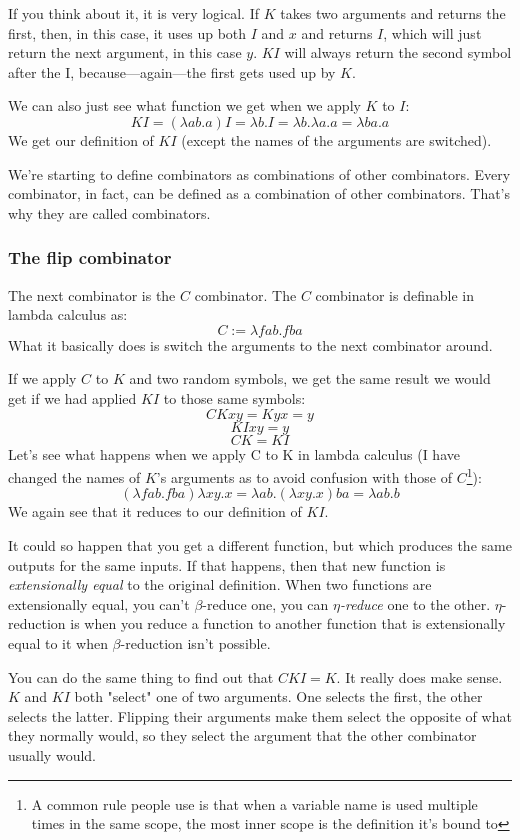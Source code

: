 \documentclass[11pt]{article}
\begin{document}
If you think about it, it is very logical. If \(K\) takes two arguments and
returns the first, then, in this case, it uses up both \(I\) and \(x\) and
returns \(I\), which will just return the next argument, in this case \(y\).
\(KI\) will always return the second symbol after the I, because---again---the
first gets used up by \(K\).

We can also just see what function we get when we apply \(K\) to \(I\):
\[KI=(\lambda ab.a)I=\lambda b.I=\lambda b.\lambda a.a=\lambda ba.a\] We get
our definition of \(KI\) (except the names of the arguments are switched).

We're starting to define combinators as combinations of other combinators.
Every combinator, in fact, can be defined as a combination of other
combinators. That's why they are called combinators.

\subsubsection{The flip combinator}\label{flipcombinator}

The next combinator is the \(C\) combinator. The \(C\) combinator is definable
in lambda calculus as:
\[C:=\lambda fab.fba\]
What it basically does is switch the arguments to the next combinator around.

If we apply \(C\) to \(K\) and two random symbols, we get the same result we
would get if we had applied \(KI\) to those same symbols:
\[CKxy=Kyx=y\]
\[KIxy=y\]
\[CK=KI\]
Let's see what happens when we apply C to K in lambda calculus (I have changed
the names of \(K\)'s arguments as to avoid confusion with those of
\(C\)\footnote{A common rule people use is that when a variable name is used
multiple times in the same scope, the most inner scope is the definition it's
bound to}):
\[(\lambda fab.fba)\lambda xy.x=\lambda ab.(\lambda xy.x)ba=\lambda ab.b\]
We again see that it reduces to our definition of \(KI\).

It could so happen that you get a different function, but which produces the
same outputs for the same inputs. If that happens, then that new function is
\emph{extensionally equal} to the original definition. When two functions are
extensionally equal, you can't \(\beta\)-reduce one, you can
\emph{\(\eta\)-reduce} one to the other. \(\eta\)-reduction is when you reduce
a function to another function that is extensionally equal to it when
\(\beta\)-reduction isn't possible.

You can do the same thing to find out that \(CKI=K\). It really does make
sense. \(K\) and \(KI\) both "select" one of two arguments. One selects the
first, the other selects the latter. Flipping their arguments make them select
the opposite of what they normally would, so they select the argument that the
other combinator usually would.
\end{document}
